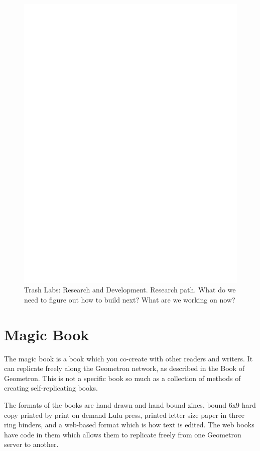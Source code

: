 \documentclass{report}
\begin{document}
\begin{figure}
	\centering
	\includegraphics[width=5in]{imageserver/uploadimages/image3.png}
	\caption{Trash Labs: Research and Development.  Research path.  What do we need to figure out how to build next? What are we working on now?}
\end{figure}

\section{Magic Book}

The magic book is a book which you co-create with other readers and writers.  It can replicate freely along the Geometron network, as described in the Book of Geometron.  This is not a specific book so much as a collection of methods of creating self-replicating books.  

The formats of the books are hand drawn and hand bound zines, bound 6x9 hard copy printed by print on demand Lulu press, printed letter size paper in three ring binders, and a web-based format which is how text is edited.  The web books have code in them which allows them to replicate freely from one Geometron server to another.  
\end{document}
